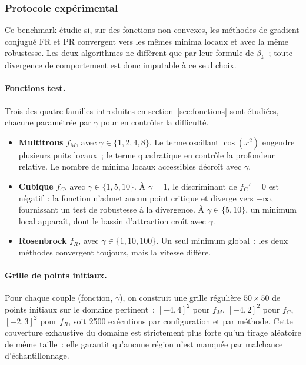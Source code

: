 \documentclass[10pt,a4paper]{article}
\begin{document}
\subsubsection{Protocole expérimental}

Ce benchmark étudie si, sur des fonctions non-convexes, les méthodes de gradient conjugué FR et PR convergent vers les mêmes minima locaux et avec la même robustesse. Les deux algorithmes ne diffèrent que par leur formule de $\beta_k$~; toute divergence de comportement est donc imputable à ce seul choix.

\paragraph{Fonctions test.} Trois des quatre familles introduites en section~\ref{sec:fonctions} sont étudiées, chacune paramétrée par $\gamma$ pour en contrôler la difficulté.

\begin{itemize}
    \item \textbf{Multitrous} $f_M$, avec $\gamma \in \{1, 2, 4, 8\}$. Le terme oscillant $\cos(x^2)$ engendre plusieurs puits locaux~; le terme quadratique en contrôle la profondeur relative. Le nombre de minima locaux accessibles décroît avec $\gamma$.
    \item \textbf{Cubique} $f_C$, avec $\gamma \in \{1, 5, 10\}$. À $\gamma = 1$, le discriminant de $f_C' = 0$ est négatif~: la fonction n'admet aucun point critique et diverge vers $-\infty$, fournissant un test de robustesse à la divergence. À $\gamma \in \{5, 10\}$, un minimum local apparaît, dont le bassin d'attraction croît avec $\gamma$.
    \item \textbf{Rosenbrock} $f_R$, avec $\gamma \in \{1, 10, 100\}$. Un seul minimum global~: les deux méthodes convergent toujours, mais la vitesse diffère.
\end{itemize}

\paragraph{Grille de points initiaux.} Pour chaque couple (fonction, $\gamma$), on construit une grille régulière $50 \times 50$ de points initiaux sur le domaine pertinent~: $[-4, 4]^2$ pour $f_M$, $[-4, 2]^2$ pour $f_C$, $[-2, 3]^2$ pour $f_R$, soit 2500 exécutions par configuration et par méthode. Cette couverture exhaustive du domaine est strictement plus forte qu'un tirage aléatoire de même taille~: elle garantit qu'aucune région n'est manquée par malchance d'échantillonnage.
\end{document}
